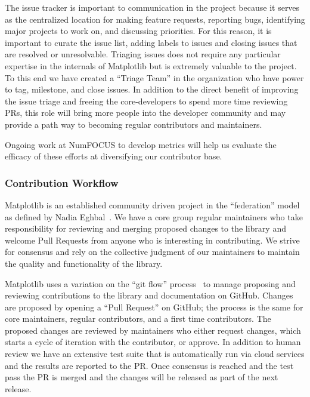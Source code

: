 \documentclass[12pt]{article}
\numberwithin{page}{section}
\begin{document}
The issue tracker is important to communication in the project because
it serves as the centralized location for making feature requests,
reporting bugs, identifying major projects to work on, and discussing
priorities.  For this reason, it is important to curate the issue
list, adding labels to issues and closing issues that are resolved or
unresolvable. Triaging issues does not require any particular
expertise in the internals of Matplotlib but is extremely valuable to
the project.  To this end we have created a ``Triage Team'' in the
organization who have power to tag, milestone, and close issues.  In
addition to the direct benefit of improving the issue triage and
freeing the core-developers to spend more time reviewing PRs, this
role will bring more people into the developer community and may
provide a path way to becoming regular contributors and maintainers.

Ongoing work at NumFOCUS to develop metrics will help us evaluate the
efficacy of these efforts at diversifying our contributor base.

\subsubsection{Contribution Workflow}


Matplotlib is an established community driven project in the
``federation'' model as defined by Nadia Eghbal~\cite{eghbal_2020}.
We have a core group regular maintainers who take responsibility for
reviewing and merging proposed changes to the library and  welcome Pull
Requests from anyone who is interesting in contributing.  We strive
for consensus and rely on the collective judgment of our maintainers
to maintain the quality and functionality of the library.

Matplotlib uses a variation on the ``git flow'' process~\cite{ghflow}
to manage proposing and reviewing contributions to the library and
documentation on GitHub.  Changes are proposed by opening a ``Pull
Request'' on GitHub; the process is the same for core maintainers,
regular contributors, and a first time contributors.  The proposed
changes are reviewed by maintainers who either request changes, which
starts a cycle of iteration with the contributor, or approve.  In
addition to human review we have an extensive test suite that is
automatically run via cloud services and the results are reported to
the PR.  Once consensus is reached and the test pass the PR is merged
and the changes will be released as part of the next release.
\end{document}
